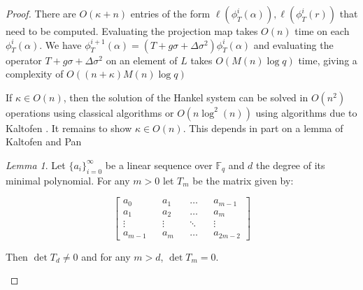 \documentclass{jams-l}
\theoremstyle{remark}
\numberwithin{equation}{section}
\newtheorem{lemma}{Lemma}
\begin{document}
\begin{proof}

There are $O(\kappa + n)$ entries of the form $\ell(\phi_T^i(\alpha)), \ell(\phi_T^i(r))$ that need to be computed. Evaluating the projection map takes $O(n)$ time on each $\phi_T^i(\alpha)$. We have $\phi_T^{i+1}(\alpha) = (T + g\sigma + \Delta \sigma^2)\phi_T^i(\alpha)$ and evaluating the operator $T + g\sigma + \Delta \sigma^2$ on an element of $L$ takes $O(M(n)\log q)$ time, giving a complexity of $O((n + \kappa)M(n)\log q)$

If $\kappa \in O(n)$, then the solution of the Hankel system can be solved in $O(n^2)$ operations using classical algorithms or $O(n \log^2(n))$ using algorithms due to Kaltofen \cite{kaltofen1994}. It remains to show $\kappa \in O(n)$. This depends in part on a lemma of Kaltofen and Pan \cite{Kaltofen:1991:PEP:113379.113396}

\begin{lemma}\label{kalpan}
Let $\{a_i\}_{i=0}^{\infty}$ be a linear sequence over $\mathbb{F}_q$ and $d$ the degree of its minimal polynomial. For any $m > 0$ let $T_m$ be the matrix given by:

\[\begin{bmatrix} a_0 && a_1 && \ldots && a_{m-1} \\ a_1 && a_2 && \ldots && a_{m} \\ \vdots && \vdots && \ddots && \vdots \\ a_{m-1} && a_{m} && \ldots && a_{2m - 2}  \end{bmatrix}\]

\noindent Then $\det T_d \neq 0$ and for any $m > d$, $\det T_m = 0$.
\end{lemma}



\end{proof}
\end{document}
